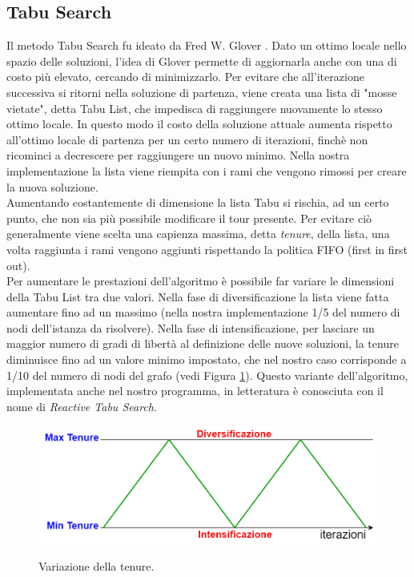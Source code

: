 \subsection{Tabu Search}
Il metodo Tabu Search fu ideato da Fred W. Glover \cite{Tabu}. Dato un ottimo locale nello spazio delle soluzioni, l'idea di Glover permette di aggiornarla anche con una di costo più elevato, cercando di minimizzarlo. Per evitare che all'iterazione successiva si ritorni nella soluzione di partenza, viene creata una lista di "mosse vietate", detta Tabu List, che impedisca di raggiungere nuovamente lo stesso ottimo locale. In questo modo il costo della soluzione attuale aumenta rispetto all'ottimo locale di partenza per un certo numero di iterazioni, finchè non ricominci a decrescere per raggiungere un nuovo minimo. Nella nostra implementazione la lista viene riempita con i rami che vengono rimossi per creare la nuova soluzione.\\
Aumentando costantemente di dimensione la lista Tabu si rischia, ad un certo punto, che non sia più possibile modificare il tour presente. Per evitare ciò generalmente viene scelta una capienza massima, detta \textit{tenure}, della lista, una volta raggiunta i rami vengono aggiunti rispettando la politica FIFO (first in first out).\\
Per aumentare le prestazioni dell'algoritmo è possibile far variare le dimensioni della Tabu List tra due valori. Nella fase di diversificazione la lista viene fatta aumentare fino ad un massimo (nella nostra implementazione 1/5 del numero di nodi dell'istanza da risolvere). Nella fase di intensificazione, per lasciare un maggior numero di gradi di libertà al definizione delle nuove soluzioni, la tenure diminuisce fino ad un valore minimo impostato, che nel nostro caso corrisponde a 1/10 del numero di nodi del grafo (vedi Figura \ref{tenure}). Questo variante dell'algoritmo, implementata anche nel nostro programma, in letteratura è conosciuta con il nome di \textit{Reactive Tabu Search}.
 \begin{figure}[H] 
\begin{center} 
  \includegraphics[scale=0.35]{Images/tenure}\\ 
  \caption{\footnotesize{Variazione della tenure.}}
  \label{tenure}
\end{center}
\end{figure}
